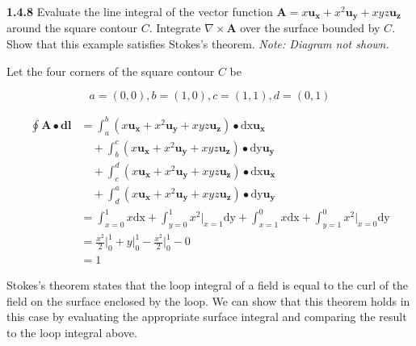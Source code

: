 \documentclass{article}
\begin{document}
\textbf{1.4.8} Evaluate the line integral of the vector function $\mathbf{A} = x\mathbf{u_x} + x^2\mathbf{u_y} +
	xyz\mathbf{u_z}$ around the square contour $C$. Integrate $\nabla \times \mathbf{A}$ over the surface bounded by $C$.
Show that this example satisfies Stokes's theorem. \@\textit{Note: Diagram not shown.}

\vspace{24pt}

Let the four corners of the square contour $C$ be

\begin{equation*}
	a = (0,0), b = (1,0), c = (1,1), d = (0,1)
\end{equation*}

\begin{equation*}
	\begin{split}
		\oint\mathbf{A} \bullet \mathbf{dl} & = \int_a^b (x\mathbf{u_x} + x^2\mathbf{u_y} + xyz\mathbf{u_z}) \bullet \text{dx} \mathbf{u_x} \\
		& \quad + \int_b^c (x\mathbf{u_x} + x^2\mathbf{u_y} + xyz\mathbf{u_z}) \bullet \text{dy} \mathbf{u_y} \\
		& \quad + \int_c^d (x\mathbf{u_x} + x^2\mathbf{u_y} + xyz\mathbf{u_z}) \bullet \text{dx} \mathbf{u_x} \\
		& \quad + \int_d^a (x\mathbf{u_x} + x^2\mathbf{u_y} + xyz\mathbf{u_z}) \bullet \text{dy} \mathbf{u_y} \\
		& = \int_{x=0}^1 x \text{dx} + \int_{y=0}^1 x^2 \rvert_{x=1} \text{dy} + \int_{x=1}^0 x \text{dx} + \int_{y=1}^0 x^2 \rvert_{x=0} \text{dy} \\
		& = \frac{x^2}{2} \bigg\rvert_0^1 + y \bigg\rvert_0^1 - \frac{x^2}{2} \bigg\rvert_0^1 - 0 \\
		& = 1
	\end{split}
\end{equation*}

Stokes's theorem states that the loop integral of a field is equal to the curl of the field on the surface enclosed by
the loop. We can show that this theorem holds in this case by evaluating the appropriate surface integral and comparing
the result to the loop integral above.
\end{document}
